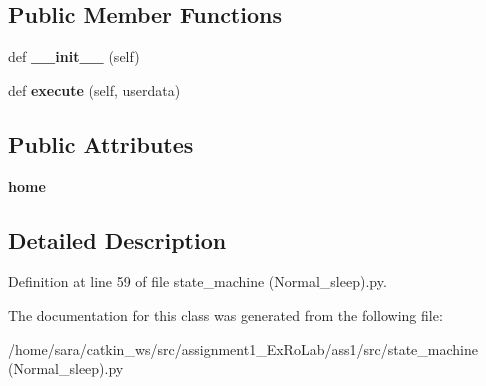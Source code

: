 \subsection*{Public Member Functions}
\begin{DoxyCompactItemize}
\item 
\mbox{\label{classstate__machine_07Normal__sleep_08_1_1Sleep_a3cc690fb5733e9be058358cf6792a57f}} 
def {\bfseries \+\_\+\+\_\+init\+\_\+\+\_\+} (self)
\item 
\mbox{\label{classstate__machine_07Normal__sleep_08_1_1Sleep_a1e11d6a88ccb353e72ccd00d714f2e04}} 
def {\bfseries execute} (self, userdata)
\end{DoxyCompactItemize}
\subsection*{Public Attributes}
\begin{DoxyCompactItemize}
\item 
\mbox{\label{classstate__machine_07Normal__sleep_08_1_1Sleep_a0076ed617842dece9f1cefe3f87e30e2}} 
{\bfseries home}
\end{DoxyCompactItemize}


\subsection{Detailed Description}


Definition at line 59 of file state\+\_\+machine (\+Normal\+\_\+sleep).\+py.



The documentation for this class was generated from the following file\+:\begin{DoxyCompactItemize}
\item 
/home/sara/catkin\+\_\+ws/src/assignment1\+\_\+\+Ex\+Ro\+Lab/ass1/src/state\+\_\+machine (\+Normal\+\_\+sleep).\+py\end{DoxyCompactItemize}
